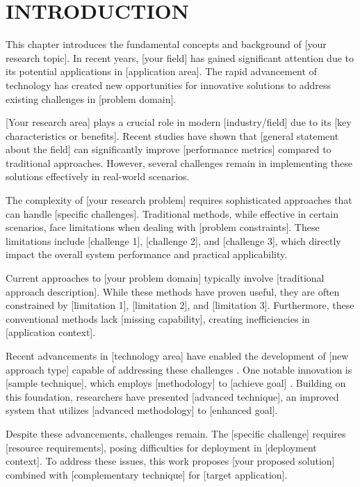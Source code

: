 \chapter{INTRODUCTION}

This chapter introduces the fundamental concepts and background of [your research topic]. In recent years, [your field] has gained significant attention due to its potential applications in [application area]. The rapid advancement of technology has created new opportunities for innovative solutions to address existing challenges in [problem domain].

[Your research area] plays a crucial role in modern [industry/field] due to its [key characteristics or benefits]. Recent studies have shown that [general statement about the field] can significantly improve [performance metrics] compared to traditional approaches. However, several challenges remain in implementing these solutions effectively in real-world scenarios.

The complexity of [your research problem] requires sophisticated approaches that can handle [specific challenges]. Traditional methods, while effective in certain scenarios, face limitations when dealing with [problem constraints]. These limitations include [challenge 1], [challenge 2], and [challenge 3], which directly impact the overall system performance and practical applicability.

Current approaches to [your problem domain] typically involve [traditional approach description]. While these methods have proven useful, they are often constrained by [limitation 1], [limitation 2], and [limitation 3]. Furthermore, these conventional methods lack [missing capability], creating inefficiencies in [application context].

Recent advancements in [technology area] have enabled the development of [new approach type] capable of addressing these challenges \cite{haynes2016crc}. One notable innovation is [sample technique], which employs [methodology] to [achieve goal] \cite{ravikumar2016optical}. Building on this foundation, researchers have presented [advanced technique], an improved system that utilizes [advanced methodology] to [enhanced goal].

Despite these advancements, challenges remain. The [specific challenge] requires [resource requirements], posing difficulties for deployment in [deployment context]. To address these issues, this work proposes [your proposed solution] combined with [complementary technique] for [target application].

